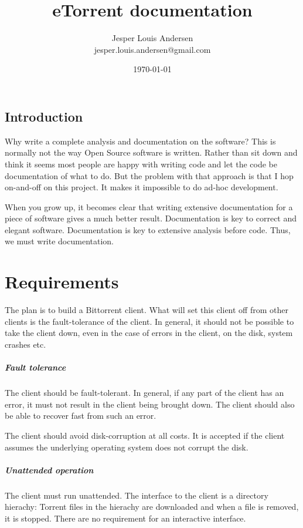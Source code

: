 \documentclass[a4paper]{memoir}
\title{eTorrent documentation}
\author{Jesper Louis Andersen \\ jesper.louis.andersen@gmail.com}
\date{\today}
\begin{document}
\maketitle{}
\tableofcontents{}

\section{Introduction}
Why write a complete analysis and documentation on the software? This
is normally not the way Open Source software is written. Rather than
sit down and think it seems most people are happy with writing code
and let the code be documentation of what to do. But the problem with
that approach is that I hop on-and-off on this project. It makes it
impossible to do ad-hoc development.

When you grow up, it becomes clear that writing extensive
documentation for a piece of software gives a much better
result. Documentation is key to correct and elegant
software. Documentation is key to extensive analysis before
code. Thus, we must write documentation.

\chapter{Requirements}
\label{chap:requirements}

The plan is to build a Bittorrent client. What will set this client
off from other clients is the fault-tolerance of the client. In
general, it should not be possible to take the client down, even in
the case of errors in the client, on the disk, system crashes etc.

\paragraph{Fault tolerance} The client should be fault-tolerant. In
general, if any part of the client has an error, it must not result in
the client being brought down. The client should also be able to
recover fast from such an error.

The client should avoid disk-corruption at all costs. It is accepted
if the client assumes the underlying operating system does not corrupt
the disk.

\paragraph{Unattended operation} The client must run unattended. The
interface to the client is a directory hierachy: Torrent files in the
hierachy are downloaded and when a file is removed, it is
stopped. There are no requirement for an interactive interface.
\end{document}
